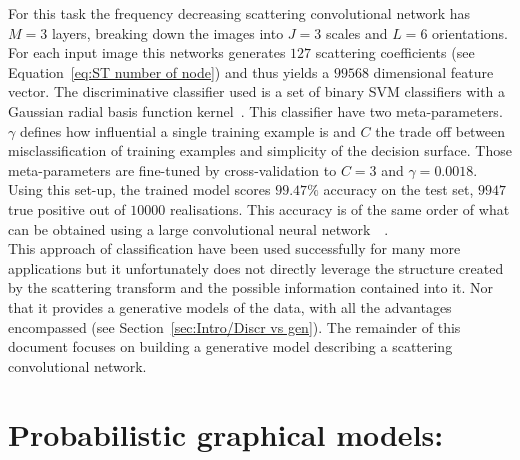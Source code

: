 \documentclass[a4paper,11pt]{report}
\begin{document}
		For this task the frequency decreasing scattering convolutional network has $M=3$ layers, breaking down the images into $J=3$ scales and $L=6$ orientations. For each input image this networks generates $127$ scattering coefficients (see Equation~\ref{eq:ST number of node}) and thus yields a $99568$ dimensional feature vector. The discriminative classifier used is a set of binary SVM classifiers with a Gaussian radial basis function kernel~\citep{scholkopf1997comparing}. This classifier have two meta-parameters. $\gamma$ defines how influential a single training example is and $C$ the trade off between misclassification of training examples and simplicity of the decision surface. Those meta-parameters are fine-tuned by cross-validation to $C = 3$ and $\gamma = 0.0018$.\\
		
		Using this set-up, the trained model scores $99.47\%$ accuracy on the test set, \ie $9947$ true positive out of $10000$ realisations. This accuracy is of the same order of what can be obtained using a large convolutional neural network~\citep{jarrett2009best}~\citep{lecun2015web}.\\
		
		This approach of classification have been used successfully for many more applications but it unfortunately does not directly leverage the structure created by the scattering transform and the possible information contained into it. Nor that it provides a generative models of the data, with all the advantages encompassed (see Section~\ref{sec:Intro/Discr vs gen}). The remainder of this document focuses on building a generative model describing a scattering convolutional network.
    
    
\chapter{Probabilistic graphical models:}
  \label{chap:PGMs}
  
\end{document}
